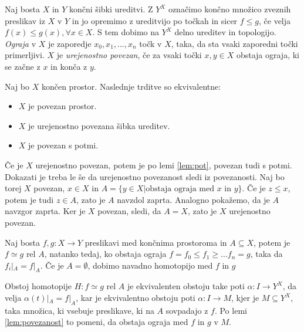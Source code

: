 \documentclass[mat1]{fmfdelo}
\begin{document}
Naj bosta $X$ in $Y$ končni šibki ureditvi. Z $Y^X$ označimo končno množico zveznih preslikav iz $X$ v $Y$ in jo opremimo z ureditvijo po točkah in sicer $f\leq g$, če velja $f(x) \leq g(x), \forall x\in X$. S tem dobimo na $Y^X$ delno ureditev in topologijo. \textit{Ograja} v $X$ je zaporedje $x_0,x_1,...,x_n$ točk v $X$, taka, da sta vsaki zaporedni točki primerljivi. $X$ je \textit{urejenostno povezan}, če za vsaki točki $x,y\in X$ obstaja ograja, ki se začne z $x$ in konča z $y$.
\begin{lema}
    Naj bo $X$ končen prostor. Naslednje trditve so ekvivalentne:

    \begin{itemize}
        \item $X$ je povezan prostor.
        \item $X$ je urejenostno povezana šibka ureditev.
        \item $X$ je povezan s potmi.
    \end{itemize}
    \label{lem:povezanost}
\end{lema}


\begin{dokaz}
    Če je $X$ urejenostno povezan, potem je po lemi \ref{lem:pot}, povezan tudi s potmi.
    Dokazati je treba le še da urejenostno povezanost sledi iz povezanosti. Naj bo torej $X$ povezan, $x\in X$ in $A=\{y\in X| \text{obstaja ograja med $x$ in $y$}\}$. Če 
    je $z\leq x$, potem je tudi $z\in A$, zato je $A$ navzdol zaprta. Analogno pokažemo, da je $A$ navzgor zaprta. Ker je $X$ povezan, sledi, da $A=X$, zato je $X$ urejenostno povezan.
\end{dokaz}

\begin{trditev}
    Naj bosta $f,g: X\rightarrow Y$ preslikavi med končnima prostoroma in $A\subseteq X$, potem je $f\simeq g$ rel $A$, natanko tedaj, ko obstaja ograja $f=f_0\leq f_1\geq ... f_n=g$, taka da $f_i|_A=f|_A$. Če je $A=\emptyset$, dobimo navadno homotopijo med $f$ in $g$
    \label{iz:ograje}
\end{trditev}

\begin{dokaz}
    Obstoj homotopije $H:f\simeq g$ rel $A$ je ekvivalenten obstoju take poti $\alpha: I \rightarrow Y^X$, da velja $\alpha(t)|_A=f|_A$, kar je ekvivalentno obstoju poti 
    $\alpha: I \rightarrow M$, kjer je $M\subseteq Y^X$, taka množica, ki vsebuje preslikave, ki na $A$ sovpadajo z $f$. Po lemi \ref{lem:povezanost} to pomeni, da obstaja ograja 
    med $f$ in $g$ v $M$.
\end{dokaz}
\end{document}
